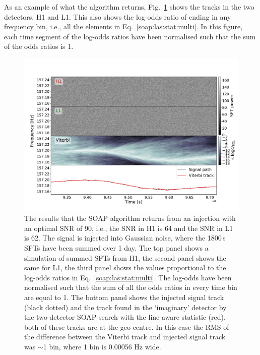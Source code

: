 %
%
As an example of what the algorithm returns, Fig.~\ref{soap:tracks} shows
the tracks in the two detectors, H1 and L1. This also shows the
log-odds ratio of ending in any
frequency bin, i.e., all the elements in Eq.~\ref{soap:las:stat:multi}.  In this figure, each time segment of the log-odds ratios have been normalised such that the sum of the odds ratios is 1.



\begin{figure}
\includegraphics[scale=0.45]{C3_soap/viterbi_tracks.pdf}
%
\caption[Example of SOAP algorithms and outputs when run on H1 and L1 spectrograms.]{\label{soap:tracks} The results that the SOAP algorithm returns from an injection with an optimal
\gls{SNR} of 90, i.e., the \gls{SNR} in H1 is 64 and the \gls{SNR} in L1 is 62.
The signal is injected into Gaussian noise, where the 1800\,s \glspl{SFT} have been
summed over 1 day.  The top panel shows a simulation of summed \glspl{SFT} from H1, the second panel shows the same for L1,
the third panel shows the values proportional to the
log-odds ratios in Eq.~\ref{soap:las:stat:multi}.
The log-odds have been normalised such that the sum of
all the odds ratios in every time bin are equal to 1. The bottom panel shows the injected signal track (black dotted) and the track found in the `imaginary' detector by the two-detector SOAP search with the line-aware statistic (red), both of these tracks are at the geo-centre. In this case the \gls{RMS} of the difference between the Viterbi track and injected signal track was $\sim$1 bin, where 1 bin is 0.00056 Hz wide.}
%
\end{figure}


